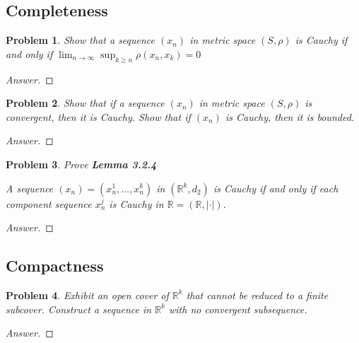 \documentclass{article}
\newtheorem{problem}{Problem}[section]
\begin{document}
\subsection{Completeness}

\begin{problem} Show that a sequence $\left(x_{n}\right)$ in metric space $(S, \rho)$ is Cauchy if and only if $\lim _{n \rightarrow \infty} \sup _{k \geq n} \rho\left(x_{n}, x_{k}\right)=0$
\end{problem}

\begin{proof}[Answer]
    
\end{proof}

\begin{problem}Show that if a sequence $\left(x_{n}\right)$ in metric space $(S, \rho)$ is convergent, then it is Cauchy. Show that if $\left(x_{n}\right)$ is Cauchy, then it is bounded.
\end{problem}

\begin{proof}[Answer]
    
\end{proof}

\begin{problem} Prove \textbf{Lemma 3.2.4}
    
    A sequence $\left(x_{n}\right)=\left(x_{n}^{1}, \ldots, x_{n}^{k}\right)$ in $\left(\mathbb{R}^{k}, d_{2}\right)$ is Cauchy if and only if each component sequence $x_{n}^{j}$ is Cauchy in $\mathbb{R}=(\mathbb{R},|\cdot|) .$
\end{problem}

\begin{proof}[Answer]
    
\end{proof}

\subsection{Compactness}

\begin{problem}Exhibit an open cover of $\mathbb{R}^{k}$ that cannot be reduced to a finite subcover. Construct a sequence in $\mathbb{R}^{k}$ with no convergent subsequence.
\end{problem}

\begin{proof}[Answer]
    
\end{proof}
\end{document}
